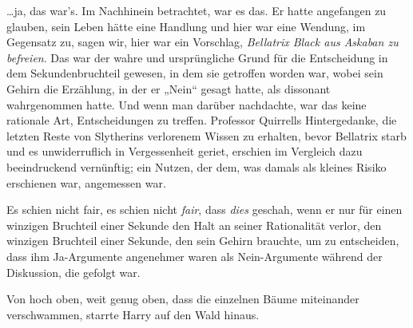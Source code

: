 …ja, das war’s. Im Nachhinein betrachtet, war es das. Er hatte angefangen zu glauben, sein Leben hätte eine Handlung und hier war eine Wendung, im Gegensatz zu, sagen wir, hier war ein Vorschlag, \emph{Bellatrix Black aus Askaban zu befreien}. Das war der wahre und ursprüngliche Grund für die Entscheidung in dem Sekundenbruchteil gewesen, in dem sie getroffen worden war, wobei sein Gehirn die Erzählung, in der er „Nein“ gesagt hatte, als dissonant wahrgenommen hatte. Und wenn man darüber nachdachte, war das keine rationale Art, Entscheidungen zu treffen. Professor Quirrells Hintergedanke, die letzten Reste von Slytherins verlorenem Wissen zu erhalten, bevor Bellatrix starb und es unwiderruflich in Vergessenheit geriet, erschien im Vergleich dazu beeindruckend vernünftig; ein Nutzen, der dem, was damals als kleines Risiko erschienen war, angemessen war.

Es schien nicht fair, es schien nicht \emph{fair}, dass \emph{dies} geschah, wenn er nur für einen winzigen Bruchteil einer Sekunde den Halt an seiner Rationalität verlor, den winzigen Bruchteil einer Sekunde, den sein Gehirn brauchte, um zu entscheiden, dass ihm Ja-Argumente angenehmer waren als Nein-Argumente während der Diskussion, die gefolgt war.

Von hoch oben, weit genug oben, dass die einzelnen Bäume miteinander verschwammen, starrte Harry auf den Wald hinaus.

